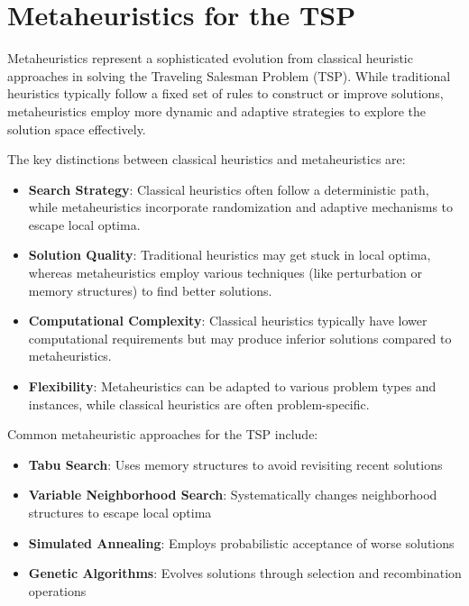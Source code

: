 \documentclass{article}
\begin{document}
\newpage

\section{Metaheuristics for the TSP}
Metaheuristics represent a sophisticated evolution from classical heuristic approaches in solving the Traveling Salesman Problem (TSP). 
While traditional heuristics typically follow a fixed set of rules to construct or improve solutions, metaheuristics employ more dynamic 
and adaptive strategies to explore the solution space effectively.

The key distinctions between classical heuristics and metaheuristics are:

\begin{itemize}
	\item \textbf{Search Strategy}: Classical heuristics often follow a deterministic path, while metaheuristics incorporate randomization and adaptive mechanisms to escape local optima.
	
	\item \textbf{Solution Quality}: Traditional heuristics may get stuck in local optima, whereas metaheuristics employ various techniques (like perturbation or memory structures) to find better solutions.
	
	\item \textbf{Computational Complexity}: Classical heuristics typically have lower computational requirements but may produce inferior solutions compared to metaheuristics.
	
	\item \textbf{Flexibility}: Metaheuristics can be adapted to various problem types and instances, while classical heuristics are often problem-specific.
\end{itemize}

Common metaheuristic approaches for the TSP include:
\begin{itemize}
	\item \textbf{Tabu Search}: Uses memory structures to avoid revisiting recent solutions
	\item \textbf{Variable Neighborhood Search}: Systematically changes neighborhood structures to escape local optima
	\item \textbf{Simulated Annealing}: Employs probabilistic acceptance of worse solutions
	\item \textbf{Genetic Algorithms}: Evolves solutions through selection and recombination operations
\end{itemize}
\end{document}
